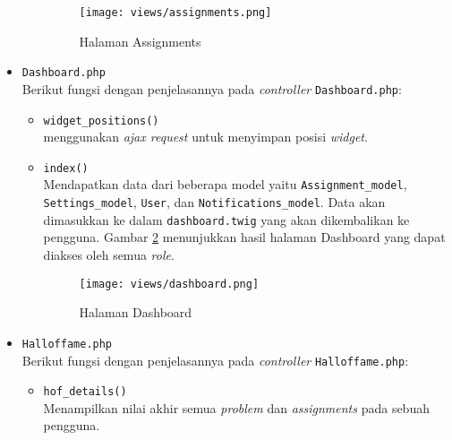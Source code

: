 \begin{itemize}
\begin{itemize}
		            \vspace{0.5cm}

		            \begin{figure}[H]
			            \centering
			            \texttt{[image: views/assignments.png]}
			            \caption{Halaman Assignments}
			            \label{fig:3:1:1:assignments}
		            \end{figure}
	      \end{itemize}

	\item \verb|Dashboard.php| \\
	      Berikut fungsi dengan penjelasannya pada \textit{controller} \verb|Dashboard.php|:

	      \begin{itemize}
		      \item \verb|widget_positions()| \\
		            menggunakan \textit{ajax request} untuk menyimpan posisi \textit{widget}.

		      \item \verb|index()| \\
		            Mendapatkan data dari beberapa model yaitu \verb|Assignment_model|, \verb|Settings_model|, \verb|User|, dan \verb|Notifications_model|. Data akan dimasukkan ke dalam \verb|dashboard.twig| yang akan dikembalikan ke pengguna. Gambar \ref{fig:3:1:1:dashboard} menunjukkan hasil halaman Dashboard yang dapat diakses oleh semua \textit{role}.

		            \begin{figure}[H]
			            \centering
			            \texttt{[image: views/dashboard.png]}
			            \caption{Halaman Dashboard}
			            \label{fig:3:1:1:dashboard}
		            \end{figure}

	      \end{itemize}

	\item \verb|Halloffame.php| \\
	      Berikut fungsi dengan penjelasannya pada \textit{controller} \verb|Halloffame.php|:

	      \begin{itemize}
		      \item \verb|hof_details()| \\
		            Menampilkan nilai akhir semua \textit{problem} dan \textit{assignments} pada sebuah pengguna.


\end{itemize}
\end{itemize}
